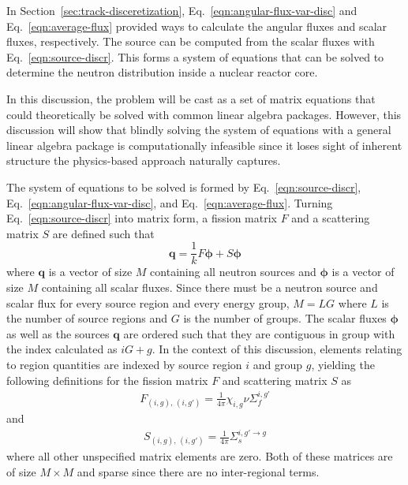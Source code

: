 In Section~\ref{sec:track-disceretization}, Eq.~\ref{eqn:angular-flux-var-disc} and Eq.~\ref{eqn:average-flux} provided ways to calculate the angular fluxes and scalar fluxes, respectively. The source can be computed from the scalar fluxes with Eq.~\ref{eqn:source-discr}. This forms a system of equations that can be solved to determine the neutron distribution inside a nuclear reactor core. 

In this discussion, the problem will be cast as a set of matrix equations that could theoretically be solved with common linear algebra packages. However, this discussion will show that blindly solving the system of equations with a general linear algebra package is computationally infeasible since it loses sight of inherent structure the physics-based approach naturally captures.

The system of equations to be solved is formed by Eq.~\ref{eqn:source-discr}, Eq.~\ref{eqn:angular-flux-var-disc}, and Eq.~\ref{eqn:average-flux}. Turning Eq.~\ref{eqn:source-discr} into matrix form, a fission matrix $F$ and a scattering matrix $S$ are defined such that
\begin{equation}
\mathbf{q} = \frac{1}{k} F \boldsymbol{\phi} + S \boldsymbol{\phi}
\label{eqn:matrix-source-calc}
\end{equation}
where $\mathbf{q}$ is a vector of size $M$ containing all neutron sources and $\boldsymbol{\phi}$ is a vector of size $M$ containing all scalar fluxes. Since there must be a neutron source and scalar flux for every source region and every energy group, $M = L G$ where $L$ is the number of source regions and $G$ is the number of groups. The scalar fluxes $\boldsymbol{\phi}$ as well as the sources $\mathbf{q}$ are ordered such that they are contiguous in group with the index calculated as $i G + g$. In the context of this discussion, elements relating to region quantities are indexed by source region $i$ and group $g$, yielding the following definitions for the fission matrix $F$ and scattering matrix $S$ as
\begin{eqnarray}
F_{\left(i, g\right), \, \left(i, g'\right)} = \frac{1}{4\pi} \chi_{i,g} \nu \Sigma_f^{i,g'}
\label{eqn:fission-matrix}
\end{eqnarray}
and
\begin{eqnarray}
S_{\left(i, g\right), \, \left(i, g'\right)} = \frac{1}{4\pi} \Sigma_s^{i,g' \rightarrow g}
\label{eqn:scattering-matrix}
\end{eqnarray}
where all other unspecified matrix elements are zero. Both of these matrices are of size $M \times M$ and sparse since there are no inter-regional terms.

